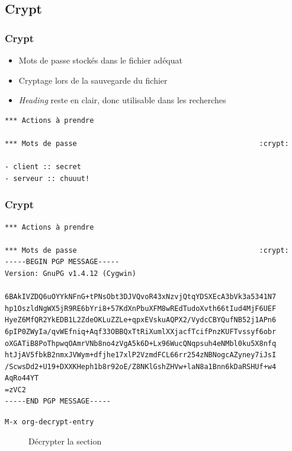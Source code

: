 \documentclass[presentation,t,hideothersubsections]{beamer}
\begin{document}
\subsection{Crypt}
\label{sec-5-2}
\begin{frame}[fragile]
\frametitle{Crypt}
\label{sec-5-2-1}


\begin{itemize}
\item Mots de passe stockés dans le fichier adéquat
\item Cryptage lors de la sauvegarde du fichier
\item \emph{Heading} reste en clair, donc utilisable dans les recherches
\end{itemize}


\lstset{language=org}
\begin{lstlisting}
*** Actions à prendre

*** Mots de passe                                           :crypt:

- client :: secret
- serveur :: chuuut!
\end{lstlisting}
\end{frame}
\begin{frame}[fragile]
\frametitle{Crypt}
\label{sec-5-2-2}



\lstset{language=org}
\begin{lstlisting}
*** Actions à prendre

*** Mots de passe                                           :crypt:
-----BEGIN PGP MESSAGE-----
Version: GnuPG v1.4.12 (Cygwin)

6BAkIVZDQ6uOYYkNFnG+tPNsObt3DJVQvoR43xNzvjQtqYDSXEcA3bVk3a5341N7
hp1OszldNgWX5jR9RE6bYri8+57KdXnPbuXFM8wREdTudoXvth66tIud4MjF6UEF
HyeZ6MfQR2YkEDB1L2ZdeOKLuZZLe+qpxEVskuAQPX2/VydcCBYQufNB52j1APn6
6pIP0ZWyIa/qvWEfniq+Aqf33OBBQxTtRiXumlXXjacfTcifPnzKUFTvssyf6obr
oXGATiB8PoThpwqOAmrVNb8no4zVgA5k6D+Lx96WucQNqpsuh4eNMbl0ku5X8nfq
htJjAV5fbkB2nmxJVWym+dfjhe17xlP2VzmdFCL66rr254zNBNogcAZyney7iJsI
/ScwsDd2+U19+DXXKHeph1b8r92oE/Z8NKlGshZHVw+laN8a1Bnn6kDaRSHUf+w4
AqRo44YT
=zVC2
-----END PGP MESSAGE-----
\end{lstlisting}

\begin{description}
\item[\texttt{M-x org-decrypt-entry}] Décrypter la section
\end{description}
\end{frame}
\end{document}
